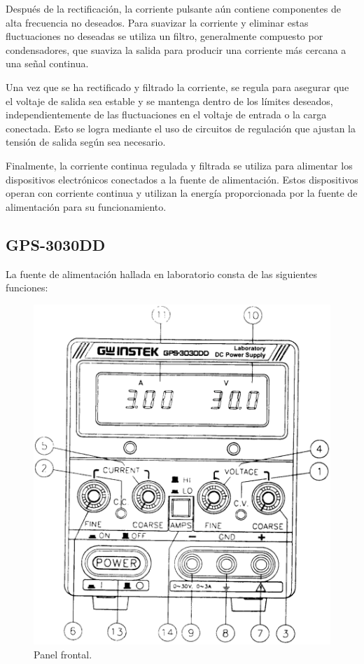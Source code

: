\documentclass[letter,twoside,11pt]{article}
\begin{document}
Después de la rectificación, la corriente pulsante aún contiene componentes de
alta frecuencia no deseados. Para suavizar la corriente y eliminar estas
fluctuaciones no deseadas se utiliza un filtro, generalmente compuesto por
condensadores, que suaviza la salida para producir una corriente más cercana a
una señal continua.

Una vez que se ha rectificado y filtrado la corriente, se regula para asegurar
que el voltaje de salida sea estable y se mantenga dentro de los límites
deseados, independientemente de las fluctuaciones en el voltaje de entrada o la
carga conectada. Esto se logra mediante el uso de circuitos de regulación que
ajustan la tensión de salida según sea necesario.

Finalmente, la corriente continua regulada y filtrada se utiliza para alimentar
los dispositivos electrónicos conectados a la fuente de alimentación. Estos
dispositivos operan con corriente continua y utilizan la energía proporcionada
por la fuente de alimentación para su funcionamiento.

\subsection{GPS-3030DD}
La fuente de alimentación hallada en laboratorio consta de las siguientes
funciones:

\begin{figure}[!h]
\centering
\includegraphics[scale=0.25]{figura1.eps}
\caption{Panel frontal.}
\end{figure}
\end{document}
